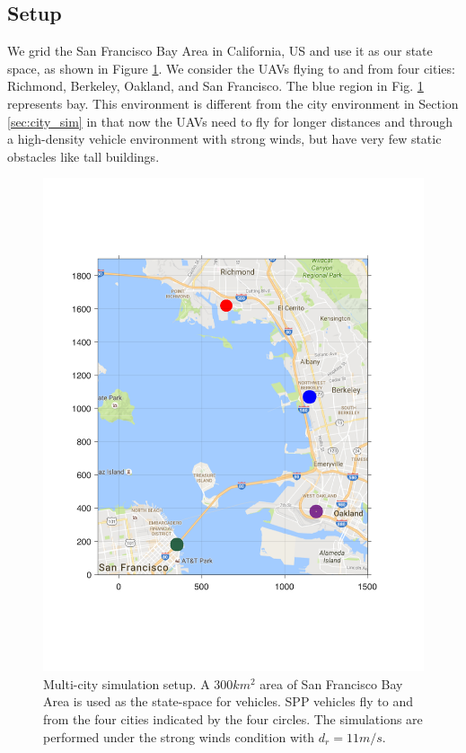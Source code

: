 \subsection{Setup \label{sec:bayArea_simSetup}}
We grid the San Francisco Bay Area in California, US and use it as our state space, as shown in Figure \ref{fig:bayArea_setup}. We consider the UAVs flying to and from four cities: Richmond, Berkeley, Oakland, and San Francisco. The blue region in Fig. \ref{fig:bayArea_setup} represents bay. This environment is different from the city environment in Section \ref{sec:city_sim} in that now the UAVs need to fly for longer distances and through a high-density vehicle environment with strong winds, but have very few static obstacles like tall buildings.    
%
\begin{figure}[H]
  \centering
  \includegraphics[width=\columnwidth]{"figs/bayArea_setup"}
  \caption{Multi-city simulation setup. A $300 km^2$ area of San Francisco Bay Area is used as the state-space for vehicles. SPP vehicles fly to and from the four cities indicated by the four circles. The simulations are performed under the strong winds condition with $d_{r} = 11 m/s$.}
  \label{fig:bayArea_setup}
\end{figure}


